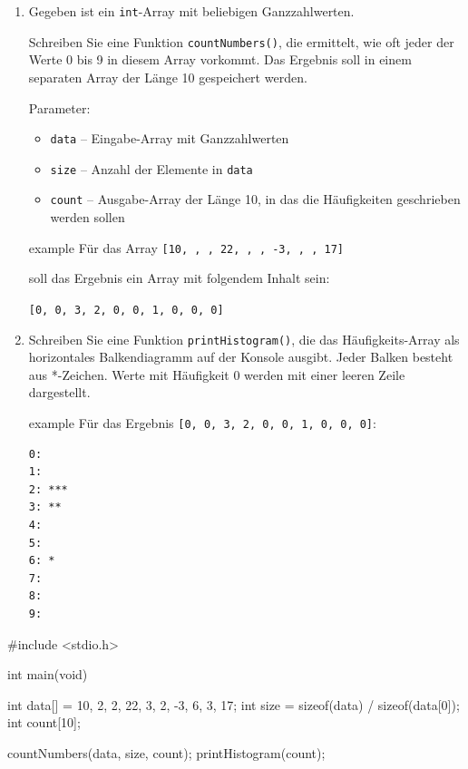 \begin{enumerate}

\item Gegeben ist ein \texttt{int}-Array mit beliebigen Ganzzahlwerten.

Schreiben Sie eine Funktion \texttt{countNumbers()}, die ermittelt, wie
oft jeder der Werte 0 bis 9 in diesem Array vorkommt. Das Ergebnis soll in einem
separaten Array der Länge 10 gespeichert werden.

Parameter:
\begin{itemize}
    \item \texttt{data} -- Eingabe-Array mit Ganzzahlwerten
    \item \texttt{size} -- Anzahl der Elemente in \texttt{data}
    \item \texttt{count} -- Ausgabe-Array der Länge 10, in das die
    Häufigkeiten geschrieben werden sollen
\end{itemize}

\begin{myboxtext}[title=Beispiel]{example}
Für das Array
\texttt{[10, , , 22, , , -3, , , 17]}

soll das Ergebnis ein Array mit folgendem Inhalt sein:

\texttt{[0, 0, 3, 2, 0, 0, 1, 0, 0, 0]}
\end{myboxtext}

\item Schreiben Sie eine Funktion \texttt{printHistogram()}, die das
Häufigkeits-Array als horizontales Balkendiagramm auf der Konsole ausgibt. Jeder
Balken besteht aus *-Zeichen. Werte mit Häufigkeit 0 werden mit einer leeren
Zeile dargestellt.

\begin{myboxtext}[title=Beispiel]{example}
Für das Ergebnis \texttt{[0, 0, 3, 2, 0, 0, 1, 0, 0, 0]}:
\begin{Verbatim}[commandchars=\\\{\}]
0:
1:
2: ***
3: **
4:
5:
6: *
7:
8:
9:
\end{Verbatim}
\end{myboxtext}

\end{enumerate}

\Vorlage
\begin{codebox}[lang=c, fontsize=\small]
#include <stdio.h>

int main(void) {
    int data[] = {10, 2, 2, 22, 3, 2, -3, 6, 3, 17};
    int size = sizeof(data) / sizeof(data[0]);
    int count[10];

    countNumbers(data, size, count);
    printHistogram(count);
}
\end{codebox}

